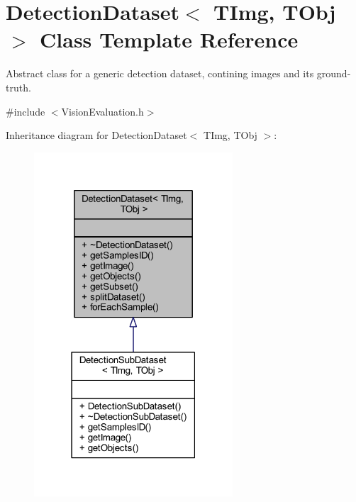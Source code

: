 \hypertarget{class_vision_core_1_1_evaluation_1_1_detection_dataset}{}\section{Detection\+Dataset$<$ T\+Img, T\+Obj $>$ Class Template Reference}
\label{class_vision_core_1_1_evaluation_1_1_detection_dataset}


Abstract class for a generic detection dataset, contining images and its ground-\/truth.  




{\ttfamily \#include $<$Vision\+Evaluation.\+h$>$}



Inheritance diagram for Detection\+Dataset$<$ T\+Img, T\+Obj $>$\+:
\nopagebreak
\begin{figure}[H]
\begin{center}
\leavevmode
\includegraphics[width=210pt]{class_vision_core_1_1_evaluation_1_1_detection_dataset__inherit__graph}
\end{center}
\end{figure}


